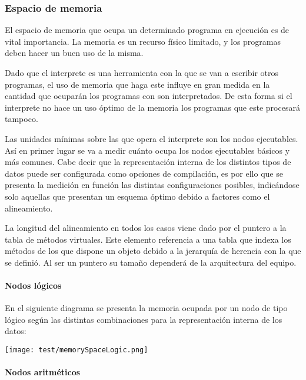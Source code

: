 \subsubsection{Espacio de memoria}
El espacio de memoria que ocupa un determinado programa en ejecución es de vital importancia. La memoria es un recurso físico limitado, y los programas deben hacer un buen 
uso de la misma.

Dado que el interprete es una herramienta con la que se van a escribir otros programas, el uso de memoria que haga este influye en gran medida 
en la cantidad que ocuparán los programas con son interpretados. De esta forma si el interprete no hace un uso óptimo de la memoria los programas que este procesará
tampoco. 

Las unidades mínimas sobre las que opera el interprete son los nodos ejecutables. Así en primer lugar se va a medir cuánto ocupa los nodos ejecutables básicos y más comunes. Cabe decir
que la representación interna de los distintos tipos de datos puede ser configurada como opciones de compilación, es por ello que se presenta la medición en función las distintas 
configuraciones posibles, indicándose solo aquellas que presentan un esquema óptimo debido a factores como el alineamiento.

La longitud del alineamiento en todos los casos viene dado por el puntero a la tabla de métodos virtuales. Este elemento referencia a una tabla que indexa los 
métodos de los que dispone un objeto debido a la jerarquía de herencia con la que se definió. Al ser un puntero su tamaño dependerá de la arquitectura del equipo.

\pagebreak 

\paragraph{Nodos lógicos}

En el siguiente diagrama se presenta la memoria ocupada por un nodo de tipo lógico según las distintas combinaciones para la representación interna de los datos:

\begin{center}
\texttt{[image: test/memorySpaceLogic.png]} 
\end{center}

\pagebreak 
\paragraph{Nodos aritméticos}

